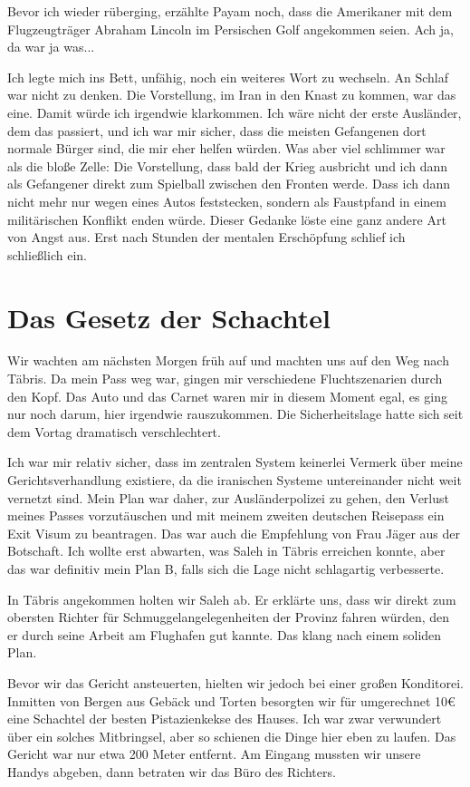Bevor ich wieder rüberging, erzählte Payam noch, dass die Amerikaner mit dem Flugzeugträger Abraham Lincoln im Persischen Golf angekommen seien. Ach ja, da war ja was...

Ich legte mich ins Bett, unfähig, noch ein weiteres Wort zu wechseln. An Schlaf war nicht zu denken. Die Vorstellung, im Iran in den Knast zu kommen, war das eine. Damit würde ich irgendwie klarkommen. Ich wäre nicht der erste Ausländer, dem das passiert, und ich war mir sicher, dass die meisten Gefangenen dort normale Bürger sind, die mir eher helfen würden. Was aber viel schlimmer war als die bloße Zelle: Die Vorstellung, dass bald der Krieg ausbricht und ich dann als Gefangener direkt zum Spielball zwischen den Fronten werde. Dass ich dann nicht mehr nur wegen eines Autos feststecken, sondern als Faustpfand in einem militärischen Konflikt enden würde. Dieser Gedanke löste eine ganz andere Art von Angst aus. Erst nach Stunden der mentalen Erschöpfung schlief ich schließlich ein.

\chapter*{Das Gesetz der Schachtel}

Wir wachten am nächsten Morgen früh auf und machten uns auf den Weg nach Täbris. Da mein Pass weg war, gingen mir verschiedene Fluchtszenarien durch den Kopf. Das Auto und das Carnet waren mir in diesem Moment egal, es ging nur noch darum, hier irgendwie rauszukommen. Die Sicherheitslage hatte sich seit dem Vortag dramatisch verschlechtert.

Ich war mir relativ sicher, dass im zentralen System keinerlei Vermerk über meine Gerichtsverhandlung existiere, da die iranischen Systeme untereinander nicht weit vernetzt sind. Mein Plan war daher, zur Ausländerpolizei zu gehen, den Verlust meines Passes vorzutäuschen und mit meinem zweiten deutschen Reisepass ein Exit Visum zu beantragen. Das war auch die Empfehlung von Frau Jäger aus der Botschaft. Ich wollte erst abwarten, was Saleh in Täbris erreichen konnte, aber das war definitiv mein Plan B, falls sich die Lage nicht schlagartig verbesserte.

In Täbris angekommen holten wir Saleh ab. Er erklärte uns, dass wir direkt zum obersten Richter für Schmuggelangelegenheiten der Provinz fahren würden, den er durch seine Arbeit am Flughafen gut kannte. Das klang nach einem soliden Plan.

Bevor wir das Gericht ansteuerten, hielten wir jedoch bei einer großen Konditorei. Inmitten von Bergen aus Gebäck und Torten besorgten wir für umgerechnet 10€ eine Schachtel der besten Pistazienkekse des Hauses. Ich war zwar verwundert über ein solches Mitbringsel, aber so schienen die Dinge hier eben zu laufen. Das Gericht war nur etwa 200 Meter entfernt. Am Eingang mussten wir unsere Handys abgeben, dann betraten wir das Büro des Richters.

